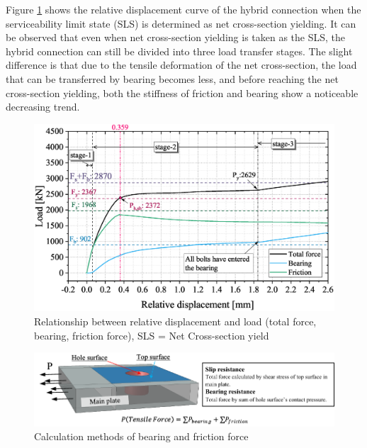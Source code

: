 Figure \ref{fig-lrd-ncy} shows the relative displacement curve of the hybrid connection when the serviceability limit state (SLS) is determined as net cross-section yielding. It can be observed that even when net cross-section yielding is taken as the SLS, the hybrid connection can still be divided into three load transfer stages. The slight difference is that due to the tensile deformation of the net cross-section, the load that can be transferred by bearing becomes less, and before reaching the net cross-section yielding, both the stiffness of friction and bearing show a noticeable decreasing trend.


\begin{figure}
    \centering
    \includegraphics[width=0.9\linewidth]{imgs/ch7/LD-OAP2.eps}
    \caption{Relationship between relative displacement and load (total force, bearing, friction force), SLS = Net Cross-section yield}
    \label{fig-lrd-ncy}
\end{figure}


\begin{figure}
    \centering
    \includegraphics[width=0.9\linewidth]{imgs/ch7/how2cal-fbfs.pdf}
    \caption{Calculation methods of bearing and friction force}
    \label{fig-how2cal-fbfs}
\end{figure}



